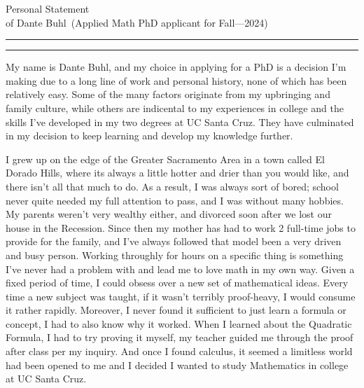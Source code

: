 \documentclass{article}
\newcommand{\soptitle}{Personal Statement}
\newcommand{\yourname}{Dante Buhl}
\begin{document}
\begin{center}\LARGE\soptitle\\
\large of \yourname\ (Applied Math PhD applicant for Fall---2024)
\end{center}

\hrule
\vspace{1pt}
\hrule height 1pt

\bigskip

My name is Dante Buhl, and my choice in applying for a PhD is a decision I'm making due to a long line of work and personal history, none of which has been relatively easy. Some of the many factors originate from my upbringing and family culture, while others are indicental to my experiences in college and the skills I've developed in my two degrees at UC Santa Cruz. They have culminated in my decision to keep learning and develop my knowledge further. 

I grew up on the edge of the Greater Sacramento Area in a town called El Dorado Hills, where its always a little hotter and drier than you would like, and there isn't all that much to do. As a result, I was always sort of bored; school never quite needed my full attention to pass, and I was without many hobbies. My parents weren't very wealthy either, and divorced soon after we lost our house in the Recession. Since then my mother has had to work 2 full-time jobs to provide for the family, and I've always followed that model been a very driven and busy person. Working throughly for hours on a specific thing is something I've never had a problem with and lead me to love math in my own way. Given a fixed period of time, I could obsess over a new set of mathematical ideas. Every time a new subject was taught, if it wasn't terribly proof-heavy, I would consume it rather rapidly. Moreover, I never found it sufficient to just learn a formula or concept, I had to also know why it worked. When I learned about the Quadratic Formula, I had to try proving it myself, my teacher guided me through the proof after class per my inquiry. And once I found calculus, it seemed a limitless world had been opened to me and I decided I wanted to study Mathematics in college at UC Santa Cruz.

\end{document}
